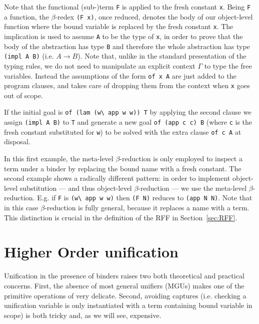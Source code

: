 \documentclass{llncs}
\begin{document}
Note that the functional (sub-)term
\verb+F+ is applied to the fresh constant \verb+x+.  Being \verb+F+ a
function, the $\beta$-redex \verb+(F x)+, once reduced, denotes the body of
our object-level function where the bound variable is replaced by the fresh
constant \verb+x+.
The implication is used to
assume \verb+A+ to be the type of \verb+x+, in order to prove that the body of
the abstraction has type \verb+B+ and therefore the whole abstraction has type
\verb+(impl A B)+ (i.e. $A \to B$). Note that, unlike in
the standard presentation of the typing rules, we do not need to manipulate an
explicit context $\Gamma$ to type the free variables. Instead the assumptions
of the form \verb+of x A+ are just added to the program clauses, and \lp{}
takes care of dropping them from the context when \verb+x+ goes out of scope.

If the initial goal is
\verb+of (lam (w\ app w w)) T+ by applying the second clause we assign
\verb+(impl A B)+ to \verb+T+ and generate
a new goal \verb+of (app c c) B+ (where \verb+c+ is the fresh constant
substituted for \verb+w+) to be solved with the extra clause \verb+of c A+
at disposal.

In this first example, the meta-level $\beta$-reduction is only employed
to inspect a term under a binder by replacing the bound name with a fresh
constant.  The second example
shows a radically different pattern: in order to implement object-level
substitution --- and thus object-level $\beta$-reduction --- we use the
meta-level $\beta$-reduction. E.g. if \verb+F+ is \verb+(w\ app w w)+
then \verb+(F N)+ reduces to \verb+(app N N)+.  Note that in this case
$\beta$-reduction is fully general, because it replaces a name with a term.
This distinction is crucial in the definition of the RFF in
Section~\ref{sec:RFF}.

\section{Higher Order unification}%

Unification in the presence of binders raises two both theoretical and
practical concerns. First, the absence of most general unifiers (MGUs) makes
one of the primitive operations of \lp{} very delicate.  Second, avoiding
captures (i.e. checking a unification variable is only instantiated with a
term containing bound variable in scope) is both tricky and, as we will see,
expensive.
\end{document}
